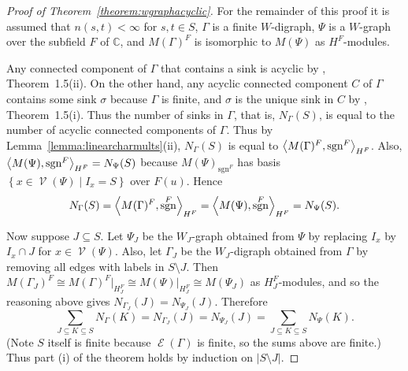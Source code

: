\documentclass[11pt,leqno]{article}
\theoremstyle{plain}
\theoremstyle{definition}
\numberwithin{subcase}{case}
\numberwithin{subsubcase}{subcase}
\numberwithin{table}{section}
\numberwithin{equation}{section}
\newcommand{\infinity}{\infty}
\newcommand{\setof}[2]{\left\{{#1}\mid{#2}\right\}}
\newcommand{\abs}[1]{\left\vert{#1}\right\vert}
\newcommand{\complexes}{\mathbb C}
\newcommand{\charprod}[3]{\left<{#1},\strut{#2}\right>_{#3}}
\DeclareMathOperator{\sgn}{sgn}
\DeclareMathOperator{\vertices}{{\mathscr V}}
\DeclareMathOperator{\edges}{{\mathscr E}}
\begin{document}
\begin{proof}[Proof of Theorem~\ref{theorem:wgraphacyclic}]
For the remainder of this proof it is
assumed that  $n(s,t) < \infinity$ for $s, t \in S$, 
$\Gamma$ is a finite $W$-digraph, $\Psi$ is a $W$-graph
over the subfield $F$ of $\complexes$, 
and $M(\Gamma)^F$ is isomorphic to $M(\Psi)$ as $H^F$-modules.

Any connected component of $\Gamma$ that
contains a sink is acyclic by 
\cite{digraphpaper}, Theorem~1.5(ii).  On the other hand,
any acyclic connected component $C$ of 
$\Gamma$ contains some sink $\sigma$ because  
$\Gamma$ is finite, 
and $\sigma$ is the unique sink
in $C$ by \cite{digraphpaper}, Theorem~1.5(i).
Thus the number of sinks in $\Gamma$, that is, 
$N_\Gamma(S)$, is equal
to the number of acyclic connected components of $\Gamma$.
Thus by  
Lemma~\ref{lemma:linearcharmults}(ii),
$N_\Gamma(S)$ 
is equal to 
$\charprod{M(\Gamma)^F}{\sgn^F}{H^F}$. 
Also, 
$\charprod{M(\Psi)}{\sgn^F}{H^F} = N_{\Psi}(S)$
because
$M(\Psi)_{\sgn^F}$ has basis 
$\setof{x \in \vertices(\Psi)}{I_x = S}$ over $F(u)$. 
Hence 
\begin{equation*}
N_{\Gamma}(S) 
=
\charprod{M(\Gamma)^F}{\sgn^F}{H^F} 
 =
\charprod{M(\Psi)}{\sgn^F}{H^F}
= N_{\Psi}(S).
\end{equation*}

Now suppose $J \subseteq S$.  Let $\Psi_J$ be the $W_J$-graph
obtained from $\Psi$ by replacing
$I_x$ by $I_x \cap J$ for $x \in \vertices(\Psi)$.  
Also, let $\Gamma_J$ be the $W_J$-digraph obtained from 
$\Gamma$ by removing all edges with labels in
$S \setminus J$. 
Then
$M(\Gamma_J)^F \cong {M(\Gamma)^F \vert_{H_J^F}}
\cong {M(\Psi) \vert_{H_J^F}} \cong M(\Psi_J)$ as $H_J^F$-modules, 
and so the reasoning above gives
$N_{\Gamma_J}(J) = N_{\Psi_J}(J)$.
Therefore 
\[
\sum_{J \subseteq K \subseteq S} N_{\Gamma}(K)
=
N_{\Gamma_J}(J)
=
N_{\Psi_J}(J)
=
\sum_{J \subseteq K \subseteq S} N_{\Psi}(K).
\]
(Note $S$ itself is finite because $\edges(\Gamma)$ is
finite, so the sums above are finite.)
Thus 
part (i) of the theorem holds
by induction on $\abs{S \setminus J}$.


\end{proof}
\end{document}
